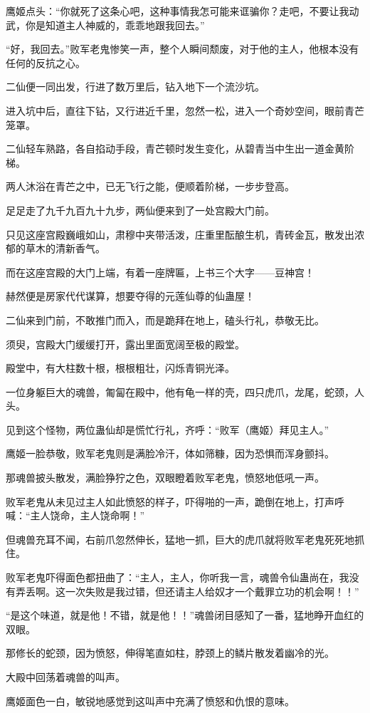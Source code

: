 \begin{this_body}
鹰姬点头：“你就死了这条心吧，这种事情我怎可能来诓骗你？走吧，不要让我动武，你是知道主人神威的，乖乖地跟我回去。”

“好，我回去。”败军老鬼惨笑一声，整个人瞬间颓废，对于他的主人，他根本没有任何的反抗之心。

二仙便一同出发，行进了数万里后，钻入地下一个流沙坑。

进入坑中后，直往下钻，又行进近千里，忽然一松，进入一个奇妙空间，眼前青芒笼罩。

二仙轻车熟路，各自掐动手段，青芒顿时发生变化，从碧青当中生出一道金黄阶梯。

两人沐浴在青芒之中，已无飞行之能，便顺着阶梯，一步步登高。

足足走了九千九百九十九步，两仙便来到了一处宫殿大门前。

只见这座宫殿巍峨如山，肃穆中夹带活泼，庄重里酝酿生机，青砖金瓦，散发出浓郁的草木的清新香气。

而在这座宫殿的大门上端，有着一座牌匾，上书三个大字——豆神宫！

赫然便是房家代代谋算，想要夺得的元莲仙尊的仙蛊屋！

二仙来到门前，不敢推门而入，而是跪拜在地上，磕头行礼，恭敬无比。

须臾，宫殿大门缓缓打开，露出里面宽阔至极的殿堂。

殿堂中，有大柱数十根，根根粗壮，闪烁青铜光泽。

一位身躯巨大的魂兽，匍匐在殿中，他有龟一样的壳，四只虎爪，龙尾，蛇颈，人头。

见到这个怪物，两位蛊仙却是慌忙行礼，齐呼：“败军（鹰姬）拜见主人。”

鹰姬一脸恭敬，败军老鬼则是满脸冷汗，体如筛糠，因为恐惧而浑身颤抖。

那魂兽披头散发，满脸狰狞之色，双眼瞪着败军老鬼，愤怒地低吼一声。

败军老鬼从未见过主人如此愤怒的样子，吓得啪的一声，跪倒在地上，打声呼喊：“主人饶命，主人饶命啊！”

但魂兽充耳不闻，右前爪忽然伸长，猛地一抓，巨大的虎爪就将败军老鬼死死地抓住。

败军老鬼吓得面色都扭曲了：“主人，主人，你听我一言，魂兽令仙蛊尚在，我没有弄丢啊。这一次失败是我过错，但还请主人给奴才一个戴罪立功的机会啊！！”

“是这个味道，就是他！不错，就是他！！”魂兽闭目感知了一番，猛地睁开血红的双眼。

那修长的蛇颈，因为愤怒，伸得笔直如柱，脖颈上的鳞片散发着幽冷的光。

大殿中回荡着魂兽的叫声。

鹰姬面色一白，敏锐地感觉到这叫声中充满了愤怒和仇恨的意味。


\end{this_body}
